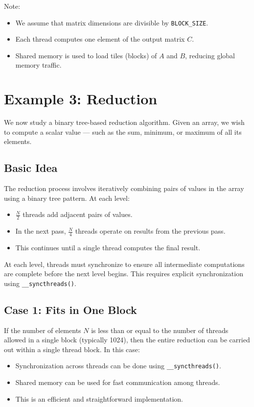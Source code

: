 \documentclass[12pt]{book}
\begin{document}
\noindent
Note:
\begin{itemize}
    \item We assume that matrix dimensions are divisible by \texttt{BLOCK\_SIZE}.
    \item Each thread computes one element of the output matrix $C$.
    \item Shared memory is used to load tiles (blocks) of $A$ and $B$, reducing global memory traffic.
\end{itemize}

\section{Example 3: Reduction}

We now study a binary tree-based reduction algorithm. Given an array, we wish to compute a scalar value — such as the sum, minimum, or maximum of all its elements.

\subsection*{Basic Idea}

The reduction process involves iteratively combining pairs of values in the array using a binary tree pattern. At each level:
\begin{itemize}
    \item $\frac{N}{2}$ threads add adjacent pairs of values.
    \item In the next pass, $\frac{N}{4}$ threads operate on results from the previous pass.
    \item This continues until a single thread computes the final result.
\end{itemize}

At each level, threads must synchronize to ensure all intermediate computations are complete before the next level begins. This requires explicit synchronization using \texttt{\_\_syncthreads()}.

\subsection*{Case 1: Fits in One Block}

If the number of elements $N$ is less than or equal to the number of threads allowed in a single block (typically 1024), then the entire reduction can be carried out within a single thread block. In this case:
\begin{itemize}
    \item Synchronization across threads can be done using \texttt{\_\_syncthreads()}.
    \item Shared memory can be used for fast communication among threads.
    \item This is an efficient and straightforward implementation.
\end{itemize}
\end{document}
